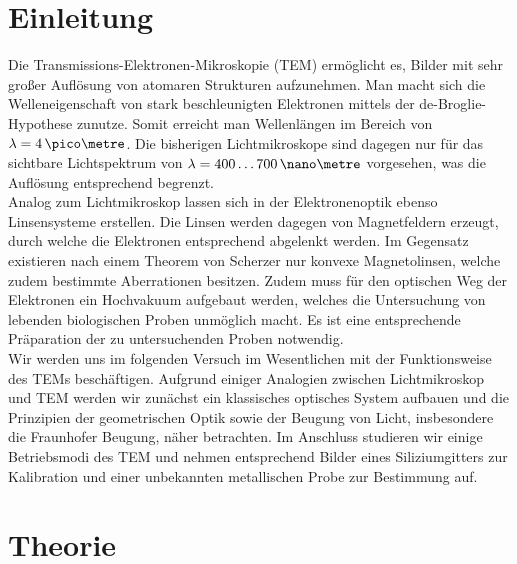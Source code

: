 
\section{Einleitung}
Die Transmissions-Elektronen-Mikroskopie (TEM) ermöglicht es, Bilder mit sehr großer Auflösung von atomaren Strukturen aufzunehmen. Man macht sich die Welleneigenschaft von stark beschleunigten Elektronen mittels der de-Broglie-Hypothese zunutze. Somit erreicht man Wellenlängen im Bereich von $\lambda=4\,\pico\metre$.
Die bisherigen Lichtmikroskope sind dagegen nur für das sichtbare Lichtspektrum von $\lambda=400\dots 700\,\nano\metre$ vorgesehen, was die Auflösung entsprechend begrenzt.\\
Analog zum Lichtmikroskop lassen sich in der Elektronenoptik ebenso Linsensysteme erstellen. Die Linsen werden dagegen von Magnetfeldern erzeugt, durch welche die Elektronen entsprechend abgelenkt werden. Im Gegensatz existieren nach einem Theorem von Scherzer nur konvexe Magnetolinsen, welche zudem bestimmte Aberrationen besitzen. Zudem muss für den optischen Weg der Elektronen ein Hochvakuum aufgebaut werden, welches die Untersuchung von lebenden biologischen Proben unmöglich macht. Es ist eine entsprechende Präparation der zu untersuchenden Proben notwendig.\\
Wir werden uns im folgenden Versuch im Wesentlichen mit der Funktionsweise des TEMs beschäftigen. Aufgrund einiger Analogien zwischen Lichtmikroskop und TEM werden wir zunächst ein klassisches optisches System aufbauen und die Prinzipien der geometrischen Optik sowie der Beugung von Licht, insbesondere die Fraunhofer Beugung, näher betrachten.
Im Anschluss studieren wir einige Betriebsmodi des TEM und nehmen entsprechend Bilder eines Siliziumgitters zur Kalibration und einer unbekannten metallischen Probe zur Bestimmung auf.
\section{Theorie}
